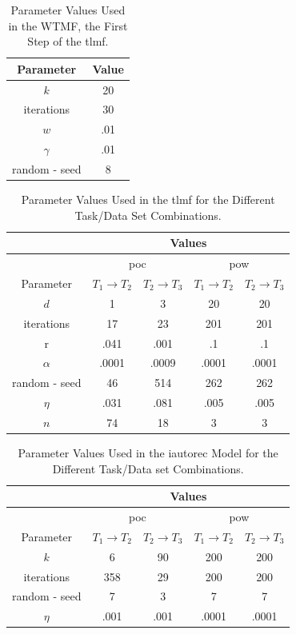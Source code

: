 \begin{table}[h!]
    \centering
    \begin{tabular}{|c|c|}
        \hline Parameter & Value \\
        \hline  $k$ & 20 \\
        iterations & 30 \\
        $w$ & .01 \\
        $\gamma$ & .01 \\
        random - seed & 8 \\
    \hline    
    \end{tabular}
    \caption{Parameter Values Used in the WTMF, the First Step of the \acrshort{tlmf}.}
    \label{tab:wtmf}
\end{table}

\begin{table}[h!]
    \centering
    \begin{tabular}{|c|c|c|c|c|}
        \hline
         & \multicolumn{4}{|c|}{Values} \\
        \hline & \multicolumn{2}{|c|}{\acrshort{poc}} & \multicolumn{2}{|c|}{\acrshort{pow}} \\
        \hline Parameter & $T_1 \to T_2$  & $T_2 \to T_3$  & $T_1 \to T_2$  & $T_2 \to T_3$ \\
        \hline  $d$ & 1 & 3 & 20 & 20\\
          iterations & 17 & 23 & 201 & 201\\
          r & .041 & .001 & .1 & .1\\
          $\alpha$ & .0001 & .0009 & .0001 & .0001\\
          random - seed & 46 & 514 & 262 & 262\\
          $\eta$ & .031 & .081 & .005 & .005\\
          $n$ & 74 & 18 & 3 & 3\\
        \hline
    \end{tabular}
    \caption{Parameter Values Used in the \acrshort{tlmf} for the Different Task/Data Set Combinations.}
    \label{tab:tlmf}
\end{table}

\begin{table}[h!]
    \centering
    \begin{tabular}{|c|c|c|c|c|}
        \hline
         & \multicolumn{4}{|c|}{Values} \\
        \hline & \multicolumn{2}{|c|}{\acrshort{poc}} & \multicolumn{2}{|c|}{\acrshort{pow}} \\
        \hline Parameter & $T_1 \to T_2$  & $T_2 \to T_3$  & $T_1 \to T_2$  & $T_2 \to T_3$ \\
        \hline  $k$ & 6 & 90 & 200 & 200\\
          iterations & 358 & 29 & 200 & 200\\
          random - seed & 7 & 3 & 7 & 7\\
          $\eta$ & .001 & .001 & .0001 & .0001\\
        \hline
    \end{tabular}
    \caption{Parameter Values Used in the \acrshort{iautorec} Model for the Different Task/Data set Combinations.}
    \label{tab:autorec}
\end{table}

